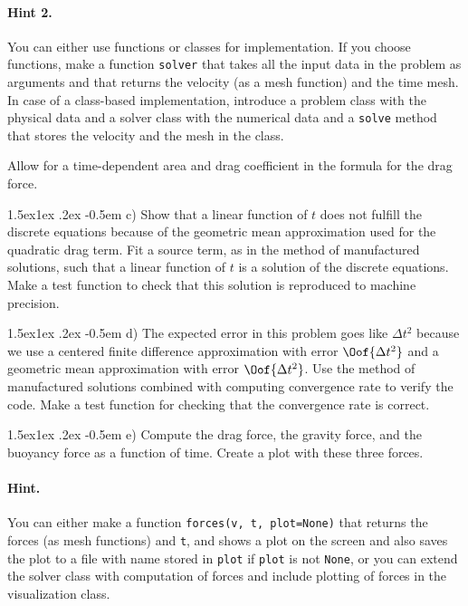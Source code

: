 \documentclass[%
oneside,                 %
final,                   %
10pt]{article}
\makeatletter
\newenvironment{doconceexercise}{}{}
\newcommand\subex{\@startsection{paragraph}{4}{\z@}%
                  {1.5ex\@plus1ex \@minus.2ex}%
                  {-0.5em}%
                  {\normalfont\normalsize\bfseries}}
\makeatother
\begin{document}
\begin{doconceexercise}


\paragraph{Hint 2.}
You can either use functions or classes for implementation.
If you choose functions, make a function
\texttt{solver} that takes all the input data in the problem as
arguments and that returns the velocity (as a mesh function) and
the time mesh. In case of a class-based implementation, introduce
a problem class with the physical data
and a solver class with the numerical data and a \texttt{solve} method
that stores the velocity and the mesh in the class.

Allow for a time-dependent area and drag coefficient in the
formula for the drag force.


\subex{c)}
Show that a linear function of $t$ does not fulfill the discrete
equations because of the geometric mean approximation
used for the quadratic drag
term.  Fit a source term, as in the method of manufactured solutions,
such that a linear function of $t$ is a solution of the discrete
equations. Make a test function to check that this solution is reproduced
to machine precision.

\subex{d)}
The expected error in this problem goes like $\Delta t^2$ because we
use a centered finite difference approximation with error $\Oof{\Delta t^2}$
and a geometric mean approximation with error $\Oof{\Delta t^2}$.
Use the method of manufactured solutions combined with computing
convergence rate to verify the code. Make a test function for checking
that the convergence rate is correct.

\subex{e)}
Compute the drag force, the gravity
force, and the buoyancy force as a function of time. Create
a plot with these three forces.


\paragraph{Hint.}
You can either make a function \texttt{forces(v, t, plot=None)}
that returns the forces (as mesh functions) and \texttt{t}, and shows
a plot on the screen and also saves the plot to a file with name
stored in \texttt{plot}
if \texttt{plot} is not \texttt{None}, or you can extend the solver class with
computation of forces and include plotting of forces in the
visualization class.


\end{doconceexercise}
\end{document}

